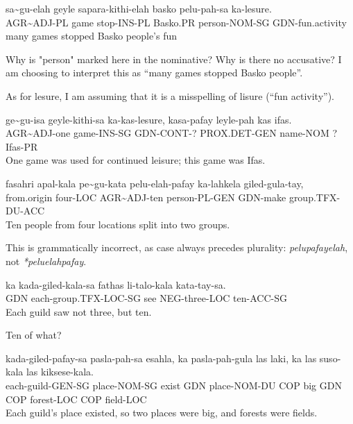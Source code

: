 \documentclass{thiguka}
\begin{document}
\begin{exe}
    \ex{} \gll{}sa\~{}gu-elah geyle sapara-kithi-elah basko pelu-pah-sa ka-lesure.\\
                AGR\~{}ADJ-PL game stop-INS-PL Basko.PR person-NOM-SG GDN-fun.activity\\
          \glt{}many games stopped Basko people's fun
\end{exe}

Why is "person" marked here in the nominative?
Why is there no accusative?
I am choosing to interpret this as ``many games stopped Basko people''.

As for lesure, I am assuming that it is a misspelling of lisure (``fun activity'').

\begin{exe}
    \ex{} \gll{}ge\~{}gu-isa geyle-kithi-sa ka-kas-lesure, kasa-pafay leyle-pah kas ifas.\\
                AGR\~{}ADJ-one game-INS-SG GDN-CONT-? PROX.DET-GEN name-NOM ? Ifas-PR\\
          \glt{}One game was used for continued leisure; this game was Ifas.
\end{exe}

\begin{exe}
    \ex{} \gll{}fasahri apal-kala pe\~{}gu-kata pelu-elah-pafay ka-lahkela giled-gula-tay,\\
                from.origin four-LOC AGR\~{}ADJ-ten person-PL-GEN GDN-make group.TFX-DU-ACC\\
          \glt{}Ten people from four locations split into two groups.
\end{exe}

This is grammatically incorrect, as case always precedes plurality: \textit{pelupafayelah}, not \textit{*peluelahpafay}.

\begin{exe}
    \ex{} \gll{}ka kada-giled-kala-sa fathas li-talo-kala kata-tay-sa.\\
                GDN each-group.TFX-LOC-SG see NEG-three-LOC ten-ACC-SG\\
          \glt{}Each guild saw not three, but ten.
\end{exe}

Ten of what?

\begin{exe}
    \ex{} \gll{}kada-giled-pafay-sa pasla-pah-sa esahla, ka pasla-pah-gula las laki, ka las suso-kala las kiksese-kala.\\
                each-guild-GEN-SG place-NOM-SG exist GDN place-NOM-DU COP big GDN COP forest-LOC COP field-LOC\\
          \glt{}Each guild's place existed, so two places were big, and forests were fields.
\end{exe}
\end{document}

